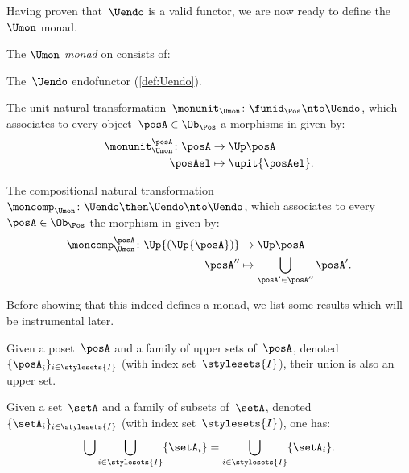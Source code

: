Having proven that~$\Uendo$ is a valid functor, we are now ready to define the~$\Umon$ monad.
\begin{definition}
    \label{def:Umon}
    The \emph{$\Umon$ monad} on \Pos consists of:
    \begin{compactenum}
        \item The~$\Uendo$ endofunctor (\cref{def:Uendo}).
        \item The unit natural transformation~$\monunit_{\Umon} \colon \funid_{\Pos}\nto \Uendo$, which associates to every object~$\posA \in \Ob_\Pos$ a morphisms in \Pos given by:
        \begin{equation}
            \begin{aligned}
                \monunit_{\Umon}^\posA\colon \posA &\to \Up \posA\\
                \posAel&\mapsto \upit \{\posAel\}.
            \end{aligned}
        \end{equation}
        \item The compositional natural transformation~$\moncomp_{\Umon}\colon \Uendo\then \Uendo\nto \Uendo$, which associates to every~$\posA\in \Ob_\Pos$ the morphism in \Pos given by:
        \begin{equation}
            \begin{aligned}
                \moncomp_{\Umon}^\posA\colon \Up{(\Up{\posA})}&\to \Up \posA\\
                \posA''&\mapsto \bigcup_{\posA'\in \posA''}\posA'.
            \end{aligned}
        \end{equation}
    \end{compactenum}
\end{definition}

Before showing that this indeed defines a monad, we list some results which will be instrumental later.
\begin{lemma}
    \label{lem:upperunionupper}
    Given a poset~$\posA$ and a family of upper sets of~$\posA$, denoted~$\{\posA_i\}_{i\in \stylesets{I}}$ (with index set~$\stylesets{I}$), their union is also an upper set.
\end{lemma}

\begin{lemma}
    \label{lem:setunionset}
    Given a set~$\setA$ and a family of subsets of~$\setA$, denoted~$\{\setA_i\}_{i\in \stylesets{I}}$ (with index set~$\stylesets{I}$), one has:
    \begin{equation}
        \bigcup \bigcup_{i\in \stylesets{I}}\{\setA_i\} = \bigcup_{i\in \stylesets{I}}\{\setA_i\}.
    \end{equation}
\end{lemma}


